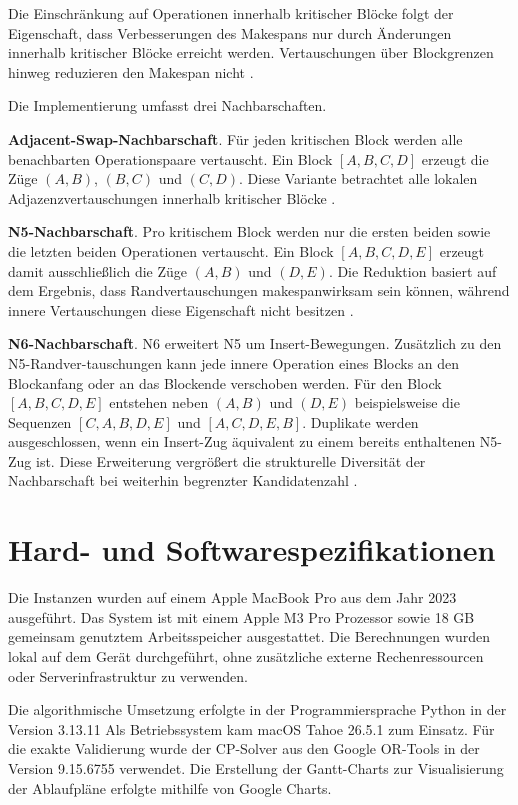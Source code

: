Die Einschränkung auf Operationen innerhalb kritischer Blöcke folgt der Eigenschaft, dass Verbesserungen des Makespans nur durch Änderungen innerhalb kritischer Blöcke erreicht werden.
Vertauschungen über Blockgrenzen hinweg reduzieren den Makespan nicht \cite{peter_j_m_van_laarhoven_job_1992}.


Die Implementierung umfasst drei Nachbarschaften.

\textbf{Adjacent-Swap-Nachbarschaft}.
Für jeden kritischen Block werden alle benachbarten Operationspaare vertauscht.
Ein Block $[A, B, C, D]$ erzeugt die Züge $(A,B)$, $(B,C)$ und $(C,D)$.
Diese Variante betrachtet alle lokalen Adjazenzvertauschungen innerhalb kritischer Blöcke \cite{peter_j_m_van_laarhoven_job_1992}
.

\textbf{N5-Nachbarschaft}.
Pro kritischem Block werden nur die ersten beiden sowie die letzten beiden Operationen vertauscht.
Ein Block $[A, B, C, D, E]$ erzeugt damit ausschließlich die Züge $(A,B)$ und $(D,E)$.
Die Reduktion basiert auf dem Ergebnis, dass Randvertauschungen makespanwirksam sein können, während innere Vertauschungen diese Eigenschaft nicht besitzen \cite{nowicki_fast_1996}
.

\textbf{N6-Nachbarschaft}.
N6 erweitert N5 um Insert-Bewegungen.
Zusätzlich zu den N5-Randver-tauschungen kann jede innere Operation eines Blocks an den Blockanfang oder an das Blockende verschoben werden.
Für den Block $[A, B, C, D, E]$ entstehen neben $(A,B)$ und $(D,E)$ beispielsweise die Sequenzen $[C, A, B, D, E]$ und $[A, C, D, E, B]$.
Duplikate werden ausgeschlossen, wenn ein Insert-Zug äquivalent zu einem bereits enthaltenen N5-Zug ist.
Diese Erweiterung vergrößert die strukturelle Diversität der Nachbarschaft bei weiterhin begrenzter Kandidatenzahl \cite{Balas&Vazacopoulos}.

\section{Hard- und Softwarespezifikationen}
\label{sec:hardware}
Die Instanzen wurden auf einem Apple MacBook Pro aus dem Jahr 2023 ausgeführt.
Das System ist mit einem Apple M3 Pro Prozessor sowie 18 GB gemeinsam genutztem Arbeitsspeicher ausgestattet.
Die Berechnungen wurden lokal auf dem Gerät durchgeführt, ohne zusätzliche externe Rechenressourcen oder Serverinfrastruktur zu verwenden.

Die algorithmische Umsetzung erfolgte in der Programmiersprache Python in der Version 3.13.11
Als Betriebssystem kam macOS Tahoe 26.5.1 zum Einsatz.
Für die exakte Validierung wurde der CP-Solver aus den Google OR-Tools in der Version 9.15.6755 verwendet.
Die Erstellung der Gantt-Charts zur Visualisierung der Ablaufpläne erfolgte mithilfe von Google Charts.